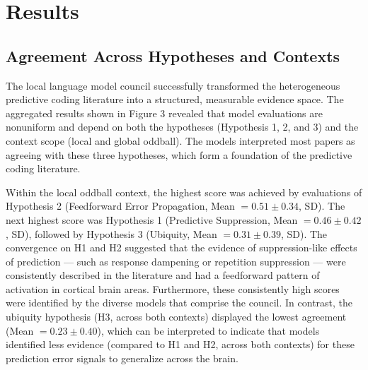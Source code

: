 \documentclass[12pt]{article}
\begin{document}
\section{Results}\label{results}

\subsection{Agreement Across Hypotheses and Contexts}\label{agreement-across-hypotheses-and-contexts}

The local language model council successfully transformed the heterogeneous predictive coding literature into a structured, measurable evidence space. The aggregated results shown in Figure 3 revealed that model evaluations are nonuniform and depend on both the hypotheses (Hypothesis 1, 2, and 3) and the context scope (local and global oddball). The models interpreted most papers as agreeing with these three hypotheses, which form a foundation of the predictive coding literature\cite{ref10,ref14,ref59}.

Within the local oddball context, the highest score was achieved by evaluations of Hypothesis 2 (Feedforward Error Propagation, Mean \(=0.51 \pm 0.34\), SD). The next highest score was Hypothesis 1 (Predictive Suppression, Mean \(=0.46 \pm 0.42\), SD), followed by Hypothesis 3 (Ubiquity, Mean \(=0.31 \pm 0.39\), SD). The convergence on H1 and H2 suggested that the evidence of suppression-like effects of prediction --- such as response dampening or repetition suppression --- were consistently described in the literature and had a feedforward pattern of activation in cortical brain areas. Furthermore, these consistently high scores were identified by the diverse models that comprise the council. In contrast, the ubiquity hypothesis (H3, across both contexts) displayed the lowest agreement (Mean \(=0.23 \pm 0.40\)), which can be interpreted to indicate that models identified less evidence (compared to H1 and H2, across both contexts) for these prediction error signals to generalize across the brain.
\end{document}
